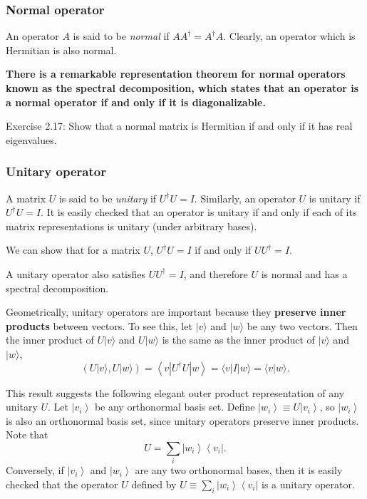 \subsubsection{Normal operator }

An operator $A$ is said to be \textit{normal} if $A A^{\dagger}=A^{\dagger} A$. Clearly, an operator which is Hermitian is also normal. 

\textbf{There is a remarkable representation theorem for normal operators known as the spectral decomposition, which states that an operator is a normal operator if and only if it is diagonalizable.}

\begin{exercise}
Exercise 2.17: Show that a normal matrix is Hermitian if and only if it has real eigenvalues.
\end{exercise}

\subsubsection{Unitary operator}

A matrix $U$ is said to be \textit{unitary} if $U^{\dagger} U=I$. Similarly, an operator $U$ is unitary if $U^{\dagger} U=I$. It is easily checked that an operator is unitary if and only if each of its matrix representations is unitary (under arbitrary bases). 

\begin{remark}
    We can show that for a matrix $U$,  $U^{\dagger} U=I$ if and only if $U U^{\dagger} =I$. 
\end{remark}

A unitary operator also satisfies $U U^{\dagger}=I$, and therefore $U$ is normal and has a spectral decomposition. 

Geometrically, unitary operators are important because they \textbf{preserve inner products} between vectors. To see this, let $|v\rangle$ and $|w\rangle$ be any two vectors. Then the inner product of $U|v\rangle$ and $U|w\rangle$ is the same as the inner product of $|v\rangle$ and $|w\rangle$,
$$
(U|v\rangle, U|w\rangle)=\left\langle v\left|U^{\dagger} U\right| w\right\rangle=\langle v|I| w\rangle=\langle v | w\rangle.
$$

This result suggests the following elegant outer product representation of any unitary $U$. Let $\left|v_{i}\right\rangle$ be any orthonormal basis set. Define $\left|w_{i}\right\rangle \equiv U\left|v_{i}\right\rangle$, so $\left|w_{i}\right\rangle$ is also an orthonormal basis set, since unitary operators preserve inner products. Note that
$$
U=\sum_{i}\left|w_{i}\right\rangle\left\langle v_{i}\right|.
$$
Conversely, if $\left|v_{i}\right\rangle$ and $\left|w_{i}\right\rangle$ are any two orthonormal bases, then it is easily checked that the operator $U$ defined by $U \equiv \sum_{i}\left|w_{i}\right\rangle\left\langle v_{i}\right|$ is a unitary operator.

